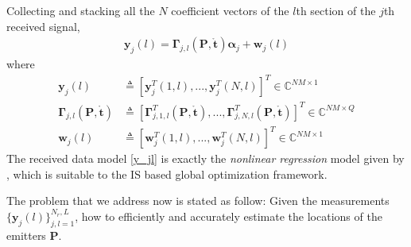 \documentclass[review]{elsarticle}
\begin{document}
Collecting and stacking all the $N$ coefficient vectors of the $l$th section of the $j$th received signal,
\begin{align}\label{y_jl}
    \boldsymbol{y}_j(l)=\boldsymbol{\Gamma}_{j,l}(\boldsymbol{P},\mathring{\boldsymbol{t}})\boldsymbol{\alpha}_j+\boldsymbol{w}_j(l)
\end{align}
where
\begin{align}\label{Gammajl}
    \boldsymbol{y}_j(l)&\triangleq[\boldsymbol{y}_j^T(1,l),...,\boldsymbol{y}_j^T(N,l)]^T\in \mathbb{C}^{NM\times 1}\\ \nonumber
    \boldsymbol{\Gamma}_{j,l}(\boldsymbol{P},\mathring{\boldsymbol{t}})&\triangleq[\boldsymbol{\Gamma}_{j,1,l}^T(\boldsymbol{P},\mathring{\boldsymbol{t}}),...,\boldsymbol{\Gamma}_{j,N,l}^T(\boldsymbol{P},\mathring{\boldsymbol{t}})]^T\in \mathbb{C}^{NM\times Q}\\ 
    \boldsymbol{w}_j(l)&\triangleq[\boldsymbol{w}_j^T(1,l),...,\boldsymbol{w}_j^T(N,l)]^T\in \mathbb{C}^{NM\times 1}\nonumber
\end{align}
The received data model \eqref{y_jl} is exactly the \emph{nonlinear regression} model given by \cite{Kay2000Mean}, which is suitable to the IS based global optimization framework.

The problem that we address now is stated as follow: Given the measurements $\lbrace\boldsymbol{y}_j(l)\rbrace_{j,l=1}^{N_r,L}$, how to efficiently and accurately estimate the locations of the emitters $\boldsymbol{P}$.
\end{document}
